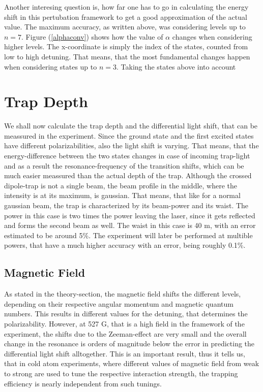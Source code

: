Another interesing question is, how far one has to go in calculating the energy shift in this pertubation framework to get a good approximation of the actual value. The maximum accuracy, as written above, was considering levels up to $n=7$. Figure (\ref{alphaconv}) shows how the value of $\alpha$ changes when considering higher levels. The x-coordinate is simply the index of the states, counted from low to high detuning. That means, that the most fundamental changes happen when considering states up to $n=3$. Taking the states above into account 

\section{Trap Depth}

We shall now calculate the trap depth and the differential light shift, that can be meassured in the experiment. Since the ground state and the first excited states have different polarizabilities, also the light shift is varying. That means, that the energy-difference between the two states changes in case of incoming trap-light and as a result the resonance-frequency of the transition shifts, which can be much easier meassured than the actual depth of the trap. Although the crossed dipole-trap is not a single beam, the beam profile in the middle, where the intensity is at its maximum, is gaussian. That means, that like for a normal gaussian beam, the trap is characterized by its beam-power and its waist. The power in this case is two times the power leaving the laser, since it gets reflected and forms the second beam as well. The waist in this case is 40 \mu m, with an error estimated to be around 5\%. The experiment will later be performed at multible powers, that have a much higher accuracy with an error, being roughly 0.1\%.
\subsection{Magnetic Field}

As stated in the theory-section, the magnetic field shifts the different levels, depending on their respective angular momentum and magnetic quantum numbers. This results in different values for the detuning, that determines the polarizability. However, at 527 G, that is a high field in the framework of the experiment, the shifts due to the Zeeman-effect are very small and the overall change in the resonance is orders of magnitude below the error in predicting the differential light shift alltogether. This is an important result, thus it tells us, that in cold atom experiments, where different values of magnetic field from weak to strong are used to tune the respective interaction strength, the trapping efficiency is nearly independent from such tunings. 
